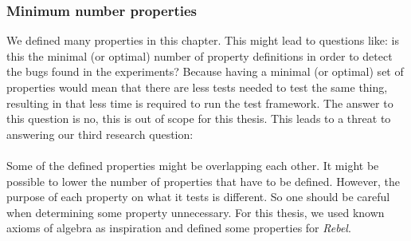 \subsubsection{Minimum number properties}
We defined many properties in this chapter. This might lead to questions like:
is this the minimal (or optimal) number of property definitions in order to
detect the bugs found in the experiments? Because having a minimal (or optimal) set of properties would mean that there are less tests needed to test the same thing, resulting in that less time is required to run the test framework. The answer to this question is no, this is out of scope
for this thesis. This leads to a threat to answering our third research
question:\rqThree\\
\\
Some of the defined properties might be overlapping each other. It might be possible to
lower the number of properties that have to be defined. However, the purpose of
each property on what it tests is different. So one should be careful when
determining some property unnecessary. For this thesis, we used known
axioms of algebra as inspiration and defined some properties for \textit{Rebel}.
